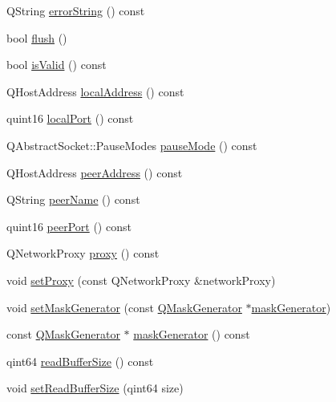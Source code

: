\begin{DoxyCompactItemize}
\item 
Q\+String \mbox{\hyperlink{class_q_web_socket_aed6ec5ee08cb1d5b3ca4d562cf1cb1b8}{error\+String}} () const
\item 
bool \mbox{\hyperlink{class_q_web_socket_a3d175f62f7db36e2e4ade46b1523efa1}{flush}} ()
\item 
bool \mbox{\hyperlink{class_q_web_socket_ad5d5224aa46a4e4429d17b0c4f6854c2}{is\+Valid}} () const
\item 
Q\+Host\+Address \mbox{\hyperlink{class_q_web_socket_aba293f65947a7690afe4e142cc77aa54}{local\+Address}} () const
\item 
quint16 \mbox{\hyperlink{class_q_web_socket_af5c606f929fe8860b5f3e2f581fd4e02}{local\+Port}} () const
\item 
Q\+Abstract\+Socket\+::\+Pause\+Modes \mbox{\hyperlink{class_q_web_socket_a15778b8a5f6ffb83c61b5e9b1701eb28}{pause\+Mode}} () const
\item 
Q\+Host\+Address \mbox{\hyperlink{class_q_web_socket_a7788b65ef72c825dc9ffcb314c20ef4d}{peer\+Address}} () const
\item 
Q\+String \mbox{\hyperlink{class_q_web_socket_a9de6e280d531c748d22898775b7f87f3}{peer\+Name}} () const
\item 
quint16 \mbox{\hyperlink{class_q_web_socket_ab8587d64043f65c8da7944541fab584c}{peer\+Port}} () const
\item 
Q\+Network\+Proxy \mbox{\hyperlink{class_q_web_socket_a6451f984f2eb43cbc5fcd6f0dd4421d9}{proxy}} () const
\item 
void \mbox{\hyperlink{class_q_web_socket_ab567ac6d43bb2f0526a1a5d0e2872034}{set\+Proxy}} (const Q\+Network\+Proxy \&network\+Proxy)
\item 
void \mbox{\hyperlink{class_q_web_socket_a3f0e24c3101e75a42264aa527936573e}{set\+Mask\+Generator}} (const \mbox{\hyperlink{class_q_mask_generator}{Q\+Mask\+Generator}} $\ast$\mbox{\hyperlink{class_q_web_socket_a20ba00f459a7e448bd611a24500d94c6}{mask\+Generator}})
\item 
const \mbox{\hyperlink{class_q_mask_generator}{Q\+Mask\+Generator}} $\ast$ \mbox{\hyperlink{class_q_web_socket_a20ba00f459a7e448bd611a24500d94c6}{mask\+Generator}} () const
\item 
qint64 \mbox{\hyperlink{class_q_web_socket_a3755970eca2be3d792ceb9c8e560ae32}{read\+Buffer\+Size}} () const
\item 
void \mbox{\hyperlink{class_q_web_socket_adc6582dd40792bb2c8309a4890236510}{set\+Read\+Buffer\+Size}} (qint64 size)
\item 

\end{DoxyCompactItemize}
